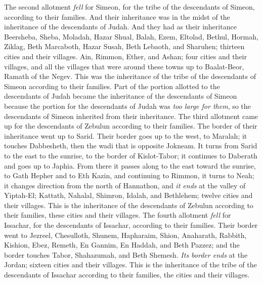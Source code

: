 \begin{biblechapter} %
 The second allotment \textit{fell} for Simeon, for the tribe of the descendants of Simeon, according to their families. And their inheritance was in the midst of the inheritance of the descendants of Judah.
\verse And they had as their inheritance Beersheba, Sheba, Moladah,
\verse Hazar Shual, Balah, Ezem,
\verse Eltolad, Bethul, Hormah,
\verse Ziklag, Beth Marcaboth, Hazar Susah,
\verse Beth Lebaoth, and Sharuhen; thirteen cities and their villages.
\verse Ain, Rimmon, Ether, and Ashan; four cities and their villages,
\verse and all the villages that were around these towns up to Baalat-Beor, Ramath of the Negev. This was the inheritance of the tribe of the descendants of Simeon according to their families.
\verse Part of the portion allotted to the descendants of Judah became the inheritance of the descendants of Simeon because the portion for the descendants of Judah was \textit{too large for them}, so the descendants of Simeon inherited from their inheritance.
 The third allotment came up for the descendants of Zebulun according to their families. The border of their inheritance went up to Sarid.
\verse Their border goes up to the west, to Maralah; it touches Dabbesheth, then the wadi that is opposite Jokneam.
\verse It turns from Sarid to the east to the sunrise, to the border of Kislot-Tabor; it continues to Daberath and goes up to Japhia.
\verse From there it passes along to the east toward the sunrise, to Gath Hepher and to Eth Kazin, and continuing to Rimmon, it turns to Neah;
\verse it changes direction from the north of Hannathon, and \textit{it ends} at the valley of Yiptah-El;
\verse Kattath, Nahalal, Shimron, Idalah, and Bethlehem; twelve cities and their villages.
\verse This is the inheritance of the descendants of Zebulun according to their families, these cities and their villages.
 The fourth allotment \textit{fell} for Issachar, for the descendants of Issachar, according to their families.
\verse Their border went to Jezreel, Chesulloth, Shunem,
\verse Hapharaim, Shion, Anaharath,
\verse Rabbith, Kishion, Ebez,
\verse Remeth, En Gannim, En Haddah, and Beth Pazzez;
\verse and the border touches Tabor, Shahazumah, and Beth Shemesh. \textit{Its border ends} at the Jordan; sixteen cities and their villages.
\verse This is the inheritance of the tribe of the descendants of Issachar according to their families, the cities and their villages.

\end{biblechapter}
